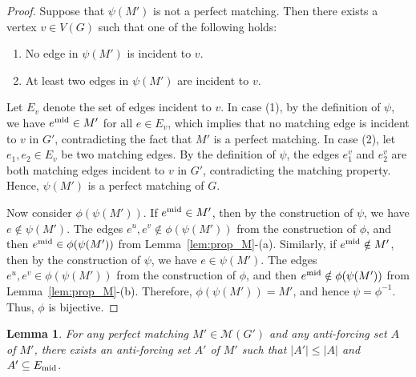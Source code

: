 \documentclass[a4paper,10pt]{article}
\newtheorem{lemma}{Lemma}
\begin{document}
\begin{proof}
Suppose that $\psi(M')$ is not a perfect matching.
Then there exists a vertex $v \in V(G)$ such that one of the following holds:
\begin{enumerate}[(1)]
    \item No edge in $\psi(M')$ is incident to $v$.
    \item At least two edges in $\psi(M')$ are incident to $v$.
\end{enumerate}
Let $E_v$ denote the set of edges incident to $v$.
In case (1), by the definition of $\psi$, we have $e^{\textnormal{mid}} \in M'$ for all $e \in E_v$, which implies that no matching edge is incident to $v$ in $G'$, contradicting the fact that $M'$ is a perfect matching.
In case (2), let $e_1, e_2 \in E_v$ be two matching edges.
By the definition of $\psi$, the edges $e_1^v$ and $e_2^v$ are both matching edges incident to $v$ in $G'$, contradicting the matching property.
Hence, $\psi(M')$ is a perfect matching of $G$.

Now consider $\phi(\psi(M'))$.
If $e^{\textnormal{mid}} \in M'$, then by the construction of $\psi$, we have $e \notin \psi(M')$.
The edges $e^u, e^v \not\in\phi(\psi(M'))$ from the construction of $\phi$, and then $e^{\textnormal{mid}} \in \phi(\psi(M'))$ from Lemma~\ref{lem:prop_M}-(a).
Similarly, if $e^{\textnormal{mid}} \notin M'$, then by the construction of $\psi$, we have $e \in \psi(M')$.
The edges $e^u, e^v \in \phi(\psi(M'))$ from the construction of $\phi$, and then $e^{\textnormal{mid}} \notin \phi(\psi(M'))$ from Lemma~\ref{lem:prop_M}-(b).
Therefore, $\phi(\psi(M')) = M'$, and hence $\psi = \phi^{-1}$.
Thus, $\phi$ is bijective.
\end{proof}

\begin{lemma} \label{lem:replace_A}
For any perfect matching $M' \in \mathcal{M}(G')$ and any anti-forcing set $A$ of $M'$, there exists an anti-forcing set $A'$ of $M'$ such that $|A'| \le |A|$ and $A'\subseteq E_{\textnormal{mid}}$.
\end{lemma}
\end{document}
